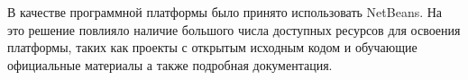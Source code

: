 \documentclass[14pt,oneside,final]{extreport}
\begin{document}
	В качестве программной платформы  было принято использовать NetBeans. На это решение повлияло наличие большого числа доступных ресурсов для освоения платформы, таких как проекты с открытым исходным кодом и обучающие официальные материалы а также подробная документация.
	
	

	
	
%	
%
%		
%	
%		
%	 
%	
	
\end{document}
